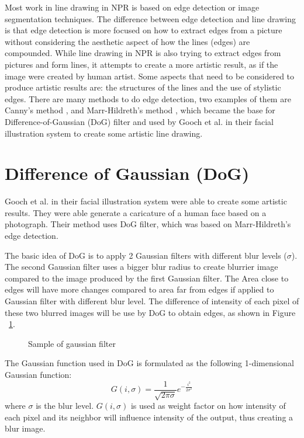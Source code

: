 Most work in line drawing in NPR is based on edge detection or image segmentation techniques. The difference between edge detection and line drawing is that edge detection is more focused on how to extract edges from a picture without considering the aesthetic aspect of how the lines (edges) are compounded. While line drawing in NPR is also trying to extract edges from pictures and form lines, it attempts to create a more artistic result, as if the image were created by human artist. Some aspects that need to be considered to produce artistic results are: the structures of the lines and the use of stylistic edges. There are many methods to do edge detection, two examples of them are Canny's method \cite{canny86}, and Marr-Hildreth's method \cite{marr-hildreth80}, which became the base for Difference-of-Gaussian (DoG) filter and used by Gooch et al. in their facial illustration system to create some artistic line drawing.

\section{Difference of Gaussian (DoG)} 
Gooch et al. in their facial illustration system \cite{gooch04} were able to create some artistic results. They were able generate a caricature of a human face based on a photograph. Their method uses DoG filter, which was based on Marr-Hildreth's edge detection.

The basic idea of DoG is to apply 2 Gaussian filters with different blur levels ($\sigma$). The second Gaussian filter uses a bigger blur radius to create blurrier image compared to the image produced by the first Gaussian filter. The Area close to edges will have more changes compared to area far from edges if applied to Gaussian filter with different blur level. The difference of intensity of each pixel of these two blurred images will be use by DoG to obtain edges, as shown in Figure ~\ref{fig:DoG_sample1}.

\begin{figure}[H]
\centering
\caption{Sample of gaussian filter}
\label{fig:DoG_sample1}
\end{figure}

The Gaussian function used in DoG is formulated as the following 1-dimensional Gaussian function:
\begin{equation}
	G(i, \sigma) = \frac{1}{\sqrt{2\pi\sigma}}e^{-\frac{i^2}{2\sigma^2}}
\end{equation}
where $\sigma$ is the blur level. $G(i, \sigma)$ is used as weight factor on how intensity of each pixel and its neighbor will influence intensity of the output, thus creating a blur image. 

